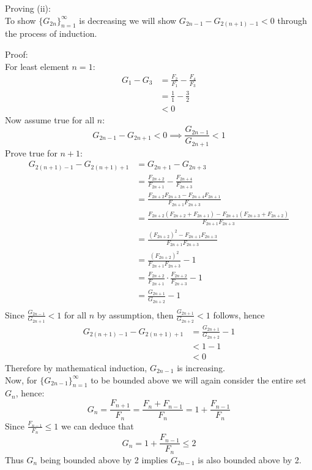 \documentclass[a4paper,11pt,twoside]{article}
\begin{document}
Proving (ii):\\
To show \(\{G_{2n}\}_{n=1}^\infty\) is decreasing we will show \(G_{2n-1} - G_{2(n+1)-1} < 0\) through the process of induction.

Proof: \\
For least element \(n = 1\):\\
\begin{align*}
    G_1 - G_3 &= \frac{F_2}{F_1} - \frac{F_4}{F_3}\\
    &= \frac{1}{1} - \frac{3}{2}\\
    &< 0
\end{align*}
Now assume true for all \(n\):\\
\begin{equation*}
    G_{2n-1} - G_{2n+1} < 0 \implies \frac{G_{2n-1}}{G_{2n+1}} < 1
\end{equation*}
Prove true for \(n+1\):
\begin{align*}
    G_{2(n+1) -1} - G_{2(n+1) + 1} &= G_{2n+1} - G_{2n+3}\\
    &= \frac{F_{2n+2}}{F_{2n+1}} - \frac{F_{2n+4}}{F_{2n+3}}\\
    &= \frac{F_{2n+2}F_{2n+3} - F_{2n+4}F_{2n+1}}{F_{2n+1}F_{2n+3}}\\
    &= \frac{F_{2n+2}(F_{2n+2}+F_{2n+1}) - F_{2n+1}(F_{2n+3}+F_{2n+2})}{F_{2n+1}F_{2n+3}}\\
    &= \frac{(F_{2n+2})^2 - F_{2n+1}F_{2n+3}}{F_{2n+1}F_{2n+3}}\\
    &= \frac{(F_{2n+2})^2}{F_{2n+1}F_{2n+3}} - 1\\
    &= \frac{F_{2n+2}}{F_{2n+1}} \cdot \frac{F_{2n+2}}{F_{2n+3}} -1\\
    &= \frac{G_{2n+1}}{G_{2n+2}} - 1\\
\end{align*}
Since \(\frac{G_{2n-1}}{G_{2n+1}} < 1\) for all \(n\) by assumption, then \(\frac{G_{2n+1}}{G_{2n+2}} < 1\)  follows, hence
\begin{align*}
    G_{2(n+1)-1} - G_{2(n+1)+1} &= \frac{G_{2n+1}}{G_{2n+2}} - 1\\
    &< 1 -1\\
    &< 0
\end{align*}
Therefore by mathematical induction, \(G_{2n-1}\) is increasing.\\
Now, for \(\{G_{2n-1}\}_{n=1}^\infty\) to be bounded above we will again consider the entire set \(G_n\), hence:
\begin{equation*}
    G_n = \frac{F_{n+1}}{F_n} =  \frac{F_n + F_{n-1}}{F_n} = 1 + \frac{F_{n-1}}{F_n}
\end{equation*}
Since \(\frac{F_{n-1}}{F_n} \le 1\) we can deduce that
\begin{equation*}
    G_n = 1 + \frac{F_{n-1}}{F_n} \le 2
\end{equation*}
Thus \(G_n\) being bounded above by 2 implies \(G_{2n-1}\) is also bounded above by 2.
\end{document}
